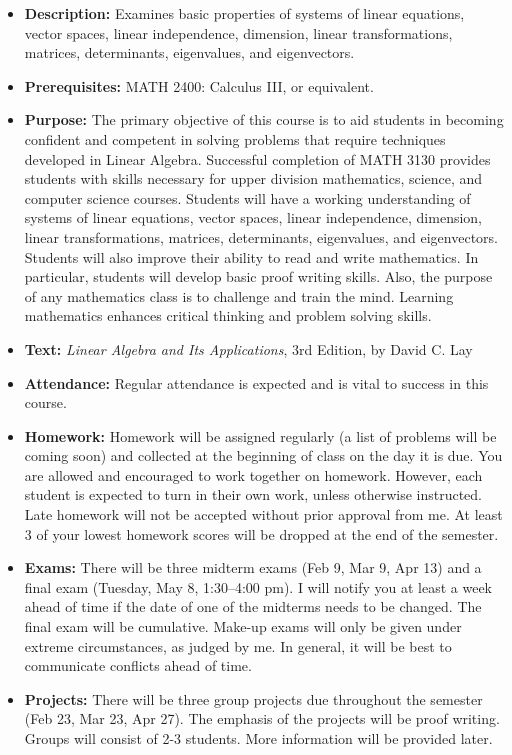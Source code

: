 \documentclass[12pt]{article}
\begin{document}
\begin{itemize}
  \item[] {\bf Description:} Examines basic properties of systems of linear equations, vector spaces, linear independence, dimension, linear transformations, matrices, determinants, eigenvalues, and eigenvectors.
  \item[] {\bf Prerequisites:} MATH 2400: Calculus III, or equivalent.
  \item[] {\bf Purpose:} The primary objective of this course is to aid students in becoming confident and competent in solving problems that require techniques developed in Linear Algebra.  Successful completion of MATH 3130 provides students with skills necessary for upper division mathematics, science, and computer science courses.  Students will have a working understanding of systems of linear equations, vector spaces, linear independence, dimension, linear transformations, matrices, determinants, eigenvalues, and eigenvectors.  Students will also improve their ability to read and write mathematics.  In particular, students will develop basic proof writing skills.  Also, the purpose of any mathematics class is to challenge and train the mind.  Learning mathematics enhances critical thinking and problem solving skills.
  \item[] {\bf Text:} {\it Linear Algebra and Its Applications}, 3rd Edition, by David C. Lay
  \item[] {\bf Attendance:}  Regular attendance is expected and is vital to success in this course.
  \item[] {\bf Homework:}  Homework will be assigned regularly (a list of problems will be coming soon) and collected at the beginning of class on the day it is due. You are allowed and encouraged to work together on homework.  However, each student is expected to turn in their own work, unless otherwise instructed.  Late homework will not be accepted without prior approval from me.  At least 3 of your lowest homework scores will be dropped at the end of the semester. 
  \item[] {\bf Exams:} There will be three midterm exams (Feb 9, Mar 9, Apr 13) and a final exam (Tuesday, May 8, 1:30--4:00 pm).  I will notify you at least a week ahead of time if the date of one of the midterms needs to be changed.  The final exam will be cumulative.  Make-up exams will only be given under extreme circumstances, as judged by me.  In general, it will be best to communicate conflicts ahead of time.
  \item[] {\bf Projects:}  There will be three group projects due throughout the semester (Feb 23, Mar 23, Apr 27). The emphasis of the projects will be proof writing.  Groups will consist of 2-3 students.  More information will be provided later.

\end{itemize}
\end{document}
